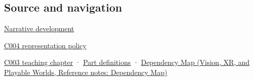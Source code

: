 \subsection{Source and navigation}\label{appendix-91d09ebed979-source-and-navigation}

\hypertarget{appendix-91d09ebed979-source-and-navigation}{}

\hyperref[01-foundations-i-ch002-bytes-become-a-durable-agreement]{Narrative development}

\hyperref[01-foundations-i-ch001-a-stretching-ruler-for-real-valued-quantities]{C004 representation policy}

\hyperref[01-foundations-i-ch002-where-the-bytes-live]{C003 teaching chapter} · \hyperref[appendix-fd090d982a15-m003---parts-41-60]{Part definitions} · \href{../07-Vision-XR-and-Playable-Worlds/main.pdf\#nameddest=appendix-4ad47bdd269a}{Dependency Map (Vision, XR, and Playable Worlds, Reference notes: Dependency Map)}
